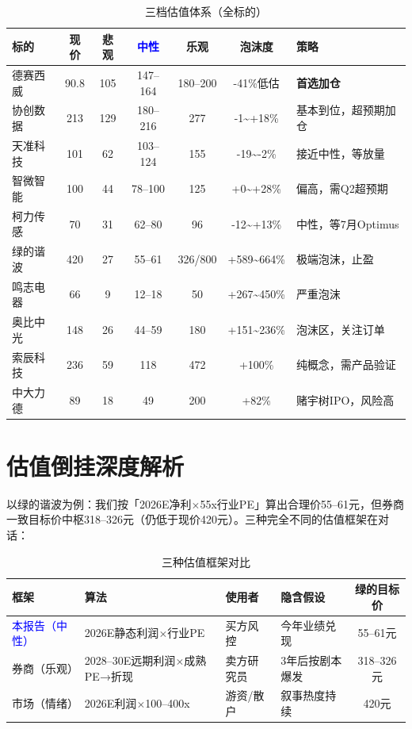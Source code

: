 \begin{table}[H]
\centering
\scriptsize
\renewcommand{\arraystretch}{1.15}
\begin{tabularx}{\textwidth}{l c c c c c X}
\toprule
\textbf{标的} & \textbf{现价} & \textbf{\textcolor{riskgreen}{悲观}} & \textbf{\textcolor{blue}{中性}} & \textbf{\textcolor{riskamber}{乐观}} & \textbf{泡沫度} & \textbf{策略} \\
\midrule
德赛西威 & 90.8 & 105 & 147--164 & 180--200 & -41\%低估 & \textbf{首选加仓} \\
协创数据 & 213 & 129 & 180--216 & 277 & -1\textasciitilde+18\% & 基本到位，超预期加仓 \\
天准科技 & 101 & 62 & 103--124 & 155 & -19\textasciitilde-2\% & 接近中性，等放量 \\
智微智能 & 100 & 44 & 78--100 & 125 & +0\textasciitilde+28\% & 偏高，需Q2超预期 \\
柯力传感 & 70 & 31 & 62--80 & 96 & -12\textasciitilde+13\% & 中性，等7月Optimus \\
绿的谐波 & 420 & 27 & 55--61 & 326/800 & +589\textasciitilde664\% & \textcolor{riskred}{极端泡沫，止盈} \\
鸣志电器 & 66 & 9 & 12--18 & 50 & +267\textasciitilde450\% & \textcolor{riskred}{严重泡沫} \\
奥比中光 & 148 & 26 & 44--59 & 180 & +151\textasciitilde236\% & 泡沫区，关注订单 \\
索辰科技 & 236 & 59 & 118 & 472 & +100\% & 纯概念，需产品验证 \\
中大力德 & 89 & 18 & 49 & 200 & +82\% & 赌宇树IPO，风险高 \\
\bottomrule
\end{tabularx}
\caption{三档估值体系（全标的）}
\end{table}

\section{估值倒挂深度解析}

以绿的谐波为例：我们按「2026E净利$\times$55x行业PE」算出合理价55--61元，但券商一致目标价中枢318--326元（仍低于现价420元）。三种完全不同的估值框架在对话：

\begin{table}[H]
\centering\scriptsize
\renewcommand{\arraystretch}{1.15}
\begin{tabularx}{\textwidth}{l X l l c}
\toprule
\textbf{框架} & \textbf{算法} & \textbf{使用者} & \textbf{隐含假设} & \textbf{绿的目标价} \\
\midrule
\textcolor{blue}{本报告（中性）} & 2026E静态利润$\times$行业PE & 买方风控 & 今年业绩兑现 & 55--61元 \\
\textcolor{riskamber}{券商（乐观）} & 2028--30E远期利润$\times$成熟PE→折现 & 卖方研究员 & 3年后按剧本爆发 & 318--326元 \\
\textcolor{riskred}{市场（情绪）} & 2026E利润$\times$100--400x & 游资/散户 & 叙事热度持续 & 420元 \\
\bottomrule
\end{tabularx}
\caption{三种估值框架对比}
\end{table}

